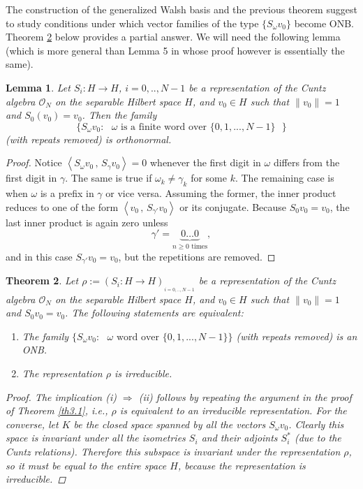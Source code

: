 \documentclass[11pt]{amsart}
\newtheorem{theorem}{Theorem}[section]
\newtheorem{lemma}[theorem]{Lemma}
\theoremstyle{definition}
\theoremstyle{remark}
\numberwithin{equation}{section}
\newcommand{\ip}[2]{\left\langle #1\, , \,#2\right\rangle}
\begin{document}
The construction of the generalized Walsh basis and the previous theorem suggest to study conditions under which vector families of the type  $\{S_{\omega}v_0\}$ become ONB. Theorem \ref{th.3.2} below provides a partial answer. We will need the following lemma (which is more general than Lemma 5 in \cite{PW} whose proof however is essentially the same).
\begin{lemma} Let $S_i:H\to H$, $i=0,..,N-1$ be a representation of the Cuntz algebra $\mathcal{O}_N$ on the separable Hilbert space $H$, and $ v_0\in H$ such that $\|v_0\|=1$ and $S_0(v_0)=v_0$. Then the family $$\{S_{\omega}v_0 : \mbox{ $\omega$ is a finite word over $\{0,1,..., N-1\}$ }\}$$  (with repeats removed) is orthonormal.
\end{lemma}
\begin{proof}
Notice $\ip{S_{\omega} v_0}{S_{\gamma} v_0}=0$ whenever the first digit in $\omega$ differs from the first digit in $\gamma$. The same is true if $\omega_k\neq \gamma_k$ for some $k$. The remaining case is when $\omega$ is a prefix in $\gamma$ or vice versa. Assuming the former, the inner product reduces to one of the form
 $\ip{v_0}{S_{\gamma'} v_0}$ or its conjugate. Because $S_0v_0=v_0$, the last inner product is again zero unless $$\gamma'= \underbrace{0\dots0}_{n\geq 0\mbox{ times}},$$ and in this case $S_{\gamma'}v_0=v_0$, but the repetitions are removed.
\end{proof}

\begin{theorem}\label{th.3.2}
Let $\rho:=(S_i:H\to H)_{_{i=0,..,N-1}}$ be a representation of the Cuntz algebra $\mathcal{O}_N$ on the separable Hilbert space $H$, and $ v_0\in H$ such that $\|v_0\|=1$ and $S_0v_0=v_0$. The following statements are equivalent:
\begin{enumerate}
	\item The family $\{S_{\omega}v_0 : \mbox{ $\omega$ word over $\{0,1,..., N-1\}$}\}$ (with repeats removed) is an ONB.
	\item The representation $\rho$ is irreducible.
\end{enumerate}

\begin{proof} The implication (i) $\Rightarrow$ (ii) follows by repeating the argument in the proof of Theorem \ref{th3.1}, i.e., $\rho$ is equivalent to an irreducible representation. For the converse, let $K$ be the closed space spanned by all the vectors $S_\omega v_0$. Clearly this space is invariant under all the isometries $S_i$ and their adjoints $S_i^*$ (due to the Cuntz relations). Therefore this subspace is invariant under the representation $\rho$, so it must be equal to the entire space $H$, because the representation is irreducible.

\end{proof}
\end{theorem}
\end{document}
